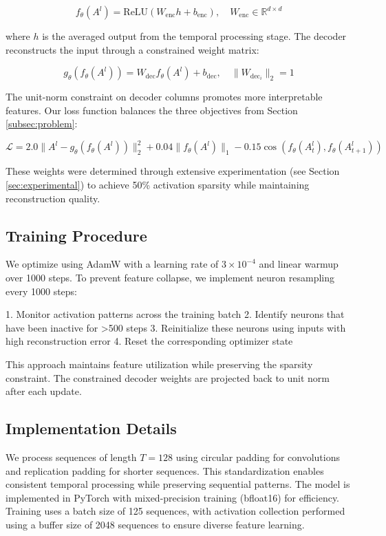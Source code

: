 \documentclass{article} %
\begin{document}
\begin{equation}
f_\theta(A^l) = \text{ReLU}(W_{\text{enc}}h + b_{\text{enc}}), \quad W_{\text{enc}} \in \mathbb{R}^{d \times d}
\end{equation}

where $h$ is the averaged output from the temporal processing stage. The decoder reconstructs the input through a constrained weight matrix:

\begin{equation}
g_\theta(f_\theta(A^l)) = W_{\text{dec}}f_\theta(A^l) + b_{\text{dec}}, \quad \|W_{\text{dec}}_i\|_2 = 1
\end{equation}

The unit-norm constraint on decoder columns promotes more interpretable features. Our loss function balances the three objectives from Section \ref{subsec:problem}:

\begin{equation}
\mathcal{L} = 2.0\|A^l - g_\theta(f_\theta(A^l))\|_2^2 + 0.04\|f_\theta(A^l)\|_1 - 0.15\cos(f_\theta(A^l_t), f_\theta(A^l_{t+1}))
\end{equation}

These weights were determined through extensive experimentation (see Section \ref{sec:experimental}) to achieve 50\% activation sparsity while maintaining reconstruction quality.

\subsection{Training Procedure}
\label{subsec:training}
We optimize using AdamW with a learning rate of $3\times10^{-4}$ and linear warmup over 1000 steps. To prevent feature collapse, we implement neuron resampling every 1000 steps:

1. Monitor activation patterns across the training batch
2. Identify neurons that have been inactive for >500 steps
3. Reinitialize these neurons using inputs with high reconstruction error
4. Reset the corresponding optimizer state

This approach maintains feature utilization while preserving the sparsity constraint. The constrained decoder weights are projected back to unit norm after each update.

\subsection{Implementation Details}
\label{subsec:implementation}
We process sequences of length $T=128$ using circular padding for convolutions and replication padding for shorter sequences. This standardization enables consistent temporal processing while preserving sequential patterns. The model is implemented in PyTorch with mixed-precision training (bfloat16) for efficiency. Training uses a batch size of 125 sequences, with activation collection performed using a buffer size of 2048 sequences to ensure diverse feature learning.
\end{document}
